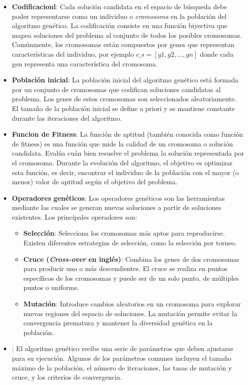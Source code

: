 \begin{itemize}
    \item  \textbf{Codificacionl}: Cada solución candidata en el espacio de búsqueda debe poder representarse como un individuo o \emph{cromosoma} en la población del algoritmo genético. La codificación consiste en una función biyectiva que mapea soluciones del problema al conjunto de todos los posibles cromosomas. Comúnmente, los cromosomas están compuestos por genes que representan características del individuo, por ejemplo  $c\_s = [g1, g2, ..., gn]$ donde cada gen representa una característica del cromosoma.


    \item \textbf{Población inicial}: La población inicial del algoritmo genético está formada por un conjunto de cromosomas que codifican soluciones candidatas al problema. Los genes de estos cromosomas son seleccionados aleatoriamente. El tamaño de la población inicial se define a priori y se mantiene constante durante las iteraciones del algoritmo.

    \item \textbf{Funcion de Fitness}: La función de aptitud (también conocida como función de fitness) es una función que mide la calidad de un cromosoma o solución candidata. Evalúa cuán bien resuelve el problema la solución representada por el cromosoma. Durante la evolución del algoritmo, el objetivo es optimizar esta función, es decir, encontrar el individuo de la población con el mayor (o menor) valor de aptitud según el objetivo del problema.

\item \textbf{Operadores genéticos}: Los operadores genéticos son las herramientas mediante las cuales se generan nuevas soluciones a partir de soluciones existentes. Los principales operadores son:
    \begin{itemize}
    \item \textbf{Selección}: Selecciona los cromosomas más aptos para reproducirse. Existen diferentes estrategias de selección, como la selección por torneo.

    \item \textbf{Cruce (\emph{Cross-over} en inglés)}: Combina los genes de dos cromosomas para producir uno o más descendientes. El cruce se realiza en puntos específicos de los cromosomas y puede ser de un solo punto, de múltiples puntos o uniforme.

    \item \textbf{Mutación}: Introduce cambios aleatorios en un cromosoma para explorar nuevas regiones del espacio de soluciones. La mutación permite evitar la convergencia prematura y mantener la diversidad genética en la población.
    \end{itemize}

\item {}: El algoritmo genético recibe una serie de parámetros que deben ajustarse para su ejecución. Algunos de los parámetros comunes incluyen el tamaño máximo de la población, el número de iteraciones, las tasas de mutación y cruce, y los criterios de convergencia.
\end{itemize}

